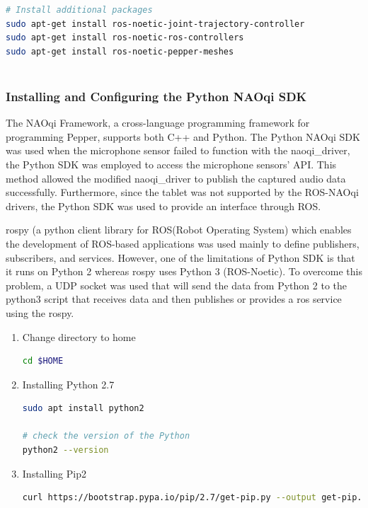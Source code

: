 \documentclass{CSSRforAfrica}
\begin{document}
{\begin{lstlisting}[style=withoutNumbering, language=bash]
# Install additional packages
sudo apt-get install ros-noetic-joint-trajectory-controller
sudo apt-get install ros-noetic-ros-controllers
sudo apt-get install ros-noetic-pepper-meshes
       
\end{lstlisting}
\subsubsection*{Installing and Configuring the Python NAOqi SDK}
{
The NAOqi Framework, a cross-language programming framework for programming Pepper, supports both C++ and Python. The Python NAOqi SDK was used when the microphone sensor failed to function with the naoqi\_driver, the Python SDK was employed to access the microphone sensors' API. This method allowed the modified naoqi\_driver to publish the captured audio data successfully. Furthermore, since the tablet was not supported by the ROS-NAOqi drivers, the Python SDK was used to provide an interface through ROS. 

rospy (a python client library for ROS(Robot Operating System) which enables the development of ROS-based applications was used mainly to define publishers, subscribers, and services. However, one of the limitations of 
Python SDK is that it runs on Python 2 whereas rospy uses Python 3 (ROS-Noetic). To overcome this problem, a UDP socket was used that will send the data from Python 2 to the python3 script that receives data and then publishes or provides a ros service using the rospy.

\begin{enumerate}
\item Change directory to home  
\begin{lstlisting}[style=withoutNumbering, language=bash]
cd $HOME
\end{lstlisting}

\item Installing Python 2.7 
\begin{lstlisting}[style=withoutNumbering, language=bash]
sudo apt install python2

# check the version of the Python
python2 --version
\end{lstlisting}

\item Installing Pip2 
\begin{lstlisting}[style=withoutNumbering, language=bash]
curl https://bootstrap.pypa.io/pip/2.7/get-pip.py --output get-pip.py
\end{lstlisting}


\end{enumerate}}}
\end{document}
